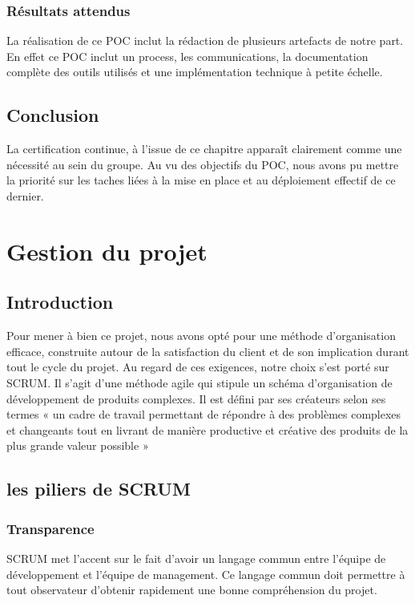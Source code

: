 \documentclass[a4paper,12pt]{book}
\theoremstyle{break}
\begin{document}
\subsection{Résultats attendus}
La réalisation de ce POC inclut la rédaction de plusieurs artefacts de notre part. 
En effet ce POC inclut un process, les communications, la documentation complète des outils utilisés et une implémentation technique à petite échelle.

\section{Conclusion}
La certification continue, à l'issue de ce chapitre apparaît clairement comme une nécessité au sein du groupe. 
Au vu des objectifs du POC, nous avons pu mettre la priorité sur les taches liées à la mise en place et au déploiement effectif de ce dernier.



\chapter{Gestion du projet}
\section{Introduction}
Pour mener à bien ce projet, nous avons opté pour une méthode d’organisation efficace, construite autour de la satisfaction du client et de son implication durant tout le cycle du projet. Au regard de ces exigences, notre choix s’est porté sur \ac{SCRUM}.
\newline
Il s'agit d'une méthode agile qui stipule un schéma d’organisation de développement de produits complexes. Il est défini par ses créateurs selon ses termes « un cadre de travail permettant de répondre à des problèmes complexes et changeants tout en livrant de manière productive et créative des produits de la plus grande valeur possible »

\section{les piliers de SCRUM}
\subsection{Transparence}
SCRUM met l'accent sur le fait d'avoir un langage commun entre l'équipe de développement et l’équipe de management. Ce langage commun doit permettre à tout observateur d'obtenir rapidement une bonne compréhension du projet. 
\end{document}
